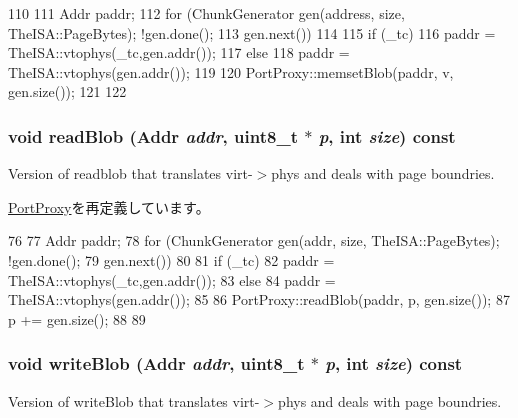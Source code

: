 \begin{DoxyCode}
110 {
111     Addr paddr;
112     for (ChunkGenerator gen(address, size, TheISA::PageBytes); !gen.done();
113          gen.next())
114     {
115         if (_tc)
116             paddr = TheISA::vtophys(_tc,gen.addr());
117         else
118             paddr = TheISA::vtophys(gen.addr());
119 
120         PortProxy::memsetBlob(paddr, v, gen.size());
121     }
122 }
\end{DoxyCode}
\hypertarget{classFSTranslatingPortProxy_a5580fe869fe8ffcffe2660eaa2c6276a}{
\subsubsection[{readBlob}]{\setlength{\rightskip}{0pt plus 5cm}void readBlob ({\bf Addr} {\em addr}, \/  uint8\_\-t $\ast$ {\em p}, \/  int {\em size}) const}}
\label{classFSTranslatingPortProxy_a5580fe869fe8ffcffe2660eaa2c6276a}
Version of readblob that translates virt-\/$>$phys and deals with page boundries. 

\hyperlink{classPortProxy_ad63586ad1fa7fd707ea7e03665c25502}{PortProxy}を再定義しています。


\begin{DoxyCode}
76 {
77     Addr paddr;
78     for (ChunkGenerator gen(addr, size, TheISA::PageBytes); !gen.done();
79          gen.next())
80     {
81         if (_tc)
82             paddr = TheISA::vtophys(_tc,gen.addr());
83         else
84             paddr = TheISA::vtophys(gen.addr());
85 
86         PortProxy::readBlob(paddr, p, gen.size());
87         p += gen.size();
88     }
89 }
\end{DoxyCode}
\hypertarget{classFSTranslatingPortProxy_ad2a72c978fca534c6afc8b0f6ac2fe19}{
\subsubsection[{writeBlob}]{\setlength{\rightskip}{0pt plus 5cm}void writeBlob ({\bf Addr} {\em addr}, \/  uint8\_\-t $\ast$ {\em p}, \/  int {\em size}) const}}
\label{classFSTranslatingPortProxy_ad2a72c978fca534c6afc8b0f6ac2fe19}
Version of writeBlob that translates virt-\/$>$phys and deals with page boundries. 

